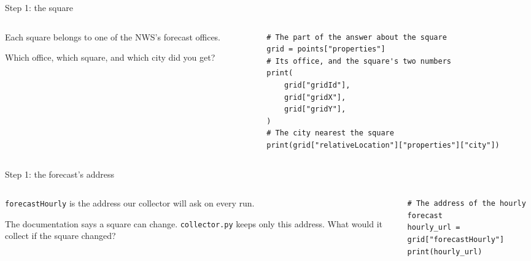 \documentclass[9pt,aspectratio=169]{beamer}
\begin{document}
\begin{frame}[fragile]{Step 1: the square}
    \begin{columns}[T]
        \begin{column}{0.37\textwidth}
            Each square belongs to one of the NWS's forecast offices.

            \medskip
            Which office, which square, and which city did you get?
        \end{column}
        \begin{column}{0.6\textwidth}
\begin{lstlisting}
# The part of the answer about the square
grid = points["properties"]
# Its office, and the square's two numbers
print(
    grid["gridId"],
    grid["gridX"],
    grid["gridY"],
)
# The city nearest the square
print(grid["relativeLocation"]["properties"]["city"])
\end{lstlisting}
        \end{column}
    \end{columns}
\end{frame}

\begin{frame}[fragile]{Step 1: the forecast's address}
    \begin{columns}[T]
        \begin{column}{0.37\textwidth}
            \texttt{forecastHourly} is the address our collector will ask on every run.

            \medskip
            The documentation says a square can change. \texttt{collector.py} keeps only this address. What would it collect if the square changed?
        \end{column}
        \begin{column}{0.6\textwidth}
\begin{lstlisting}
# The address of the hourly forecast
hourly_url = grid["forecastHourly"]
print(hourly_url)
\end{lstlisting}
        \end{column}
    \end{columns}
\end{frame}
\end{document}
